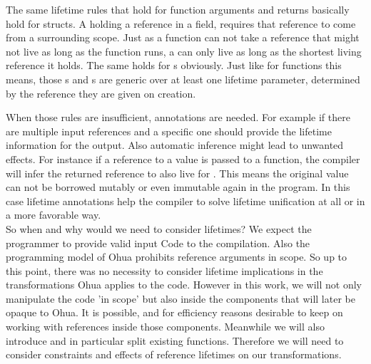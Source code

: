 The same lifetime rules that hold for function arguments and returns basically hold for structs. A  holding a reference in a field, requires that reference to come from a surrounding scope. Just as a function can not take a reference that might not live as long as the function runs, a  can only live as long as the shortest living reference it holds. The same holds for s obviously. Just like for functions this means, those s and s are generic over at least one lifetime parameter, determined by the reference they are given on creation.

When those rules are insufficient, annotations are needed. For example if there are multiple input references and a specific one should provide the lifetime information for the output. Also automatic inference might lead to unwanted effects. For instance if a reference to a  value is passed to a function, the compiler will infer the returned reference to also live for . This means the original value can not be borrowed mutably or even immutable again in the program. In this case lifetime annotations help the compiler to solve lifetime unification at all or in a more favorable way. \\

So when and why would we need to consider lifetimes? We expect the programmer to provide valid input Code to the compilation. Also the programming model of Ohua prohibits reference arguments in scope. So up to this point, there was no necessity to consider lifetime implications in the transformations Ohua applies to the code. However in this work, we will not only manipulate the code 'in scope' but also inside the components that will later be opaque to Ohua. It is possible, and for efficiency reasons desirable to keep on working with references inside those components. Meanwhile we will also introduce and in particular split existing functions. Therefore we will need to consider constraints and effects of reference lifetimes on our transformations.




